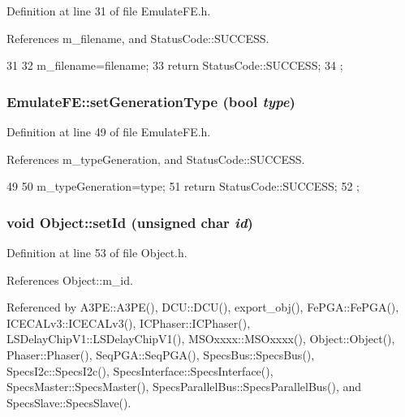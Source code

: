 Definition at line 31 of file EmulateFE.h.

References m\_\-filename, and StatusCode::SUCCESS.


\begin{DoxyCode}
31                                          {
32     m_filename=filename;
33     return StatusCode::SUCCESS;
34   };
\end{DoxyCode}
\hypertarget{classEmulateFE_ac4592687749d8a457430911ddf8f5e76}{
\subsubsection[{setGenerationType}]{ EmulateFE::setGenerationType (bool {\em type})}}
\label{classEmulateFE_ac4592687749d8a457430911ddf8f5e76}


Definition at line 49 of file EmulateFE.h.

References m\_\-typeGeneration, and StatusCode::SUCCESS.


\begin{DoxyCode}
49                                           {
50     m_typeGeneration=type;
51     return StatusCode::SUCCESS;
52   };
\end{DoxyCode}
\hypertarget{classObject_a398fe08cba594a0ce6891d59fe4f159f}{
\subsubsection[{setId}]{\setlength{\rightskip}{0pt plus 5cm}void Object::setId (unsigned char {\em id})}}
\label{classObject_a398fe08cba594a0ce6891d59fe4f159f}


Definition at line 53 of file Object.h.

References Object::m\_\-id.

Referenced by A3PE::A3PE(), DCU::DCU(), export\_\-obj(), FePGA::FePGA(), ICECALv3::ICECALv3(), ICPhaser::ICPhaser(), LSDelayChipV1::LSDelayChipV1(), MSOxxxx::MSOxxxx(), Object::Object(), Phaser::Phaser(), SeqPGA::SeqPGA(), SpecsBus::SpecsBus(), SpecsI2c::SpecsI2c(), SpecsInterface::SpecsInterface(), SpecsMaster::SpecsMaster(), SpecsParallelBus::SpecsParallelBus(), and SpecsSlave::SpecsSlave().


